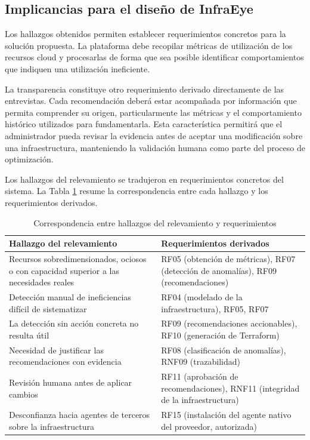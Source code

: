 \subsection{Implicancias para el diseño de InfraEye}

Los hallazgos obtenidos permiten establecer requerimientos concretos para la solución propuesta. La plataforma debe recopilar métricas de utilización de los recursos cloud y procesarlas de forma que sea posible identificar comportamientos que indiquen una utilización ineficiente.

La transparencia constituye otro requerimiento derivado directamente de las entrevistas. Cada recomendación deberá estar acompañada por información que permita comprender su origen, particularmente las métricas y el comportamiento histórico utilizados para fundamentarla. Esta característica permitirá que el administrador pueda revisar la evidencia antes de aceptar una modificación sobre una infraestructura, manteniendo la validación humana como parte del proceso de optimización.

Los hallazgos del relevamiento se tradujeron en requerimientos concretos del sistema. La Tabla \ref{tab:hallazgos-rf} resume la correspondencia entre cada hallazgo y los requerimientos derivados.

\begin{table}[H]
\centering
\scriptsize
\label{tab:hallazgos-rf}
\begin{tabular}{|p{7.5cm}|p{5.5cm}|}
\hline
\textbf{Hallazgo del relevamiento} & \textbf{Requerimientos derivados} \\
\hline
Recursos sobredimensionados, ociosos o con capacidad superior a las necesidades reales & RF05 (obtención de métricas), RF07 (detección de anomalías), RF09 (recomendaciones) \\
\hline
Detección manual de ineficiencias difícil de sistematizar & RF04 (modelado de la infraestructura), RF05, RF07 \\
\hline
La detección sin acción concreta no resulta útil & RF09 (recomendaciones accionables), RF10 (generación de Terraform) \\
\hline
Necesidad de justificar las recomendaciones con evidencia & RF08 (clasificación de anomalías), RNF09 (trazabilidad) \\
\hline
Revisión humana antes de aplicar cambios & RF11 (aprobación de recomendaciones), RNF11 (integridad de la infraestructura) \\
\hline
Desconfianza hacia agentes de terceros sobre la infraestructura & RF15 (instalación del agente nativo del proveedor, autorizada) \\
\hline
\end{tabular}
\caption{Correspondencia entre hallazgos del relevamiento y requerimientos}
\end{table}

